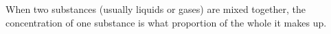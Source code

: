 When two substances (usually liquids or gases) are mixed together,
the concentration of one substance is what proportion of the whole 
it makes up.
